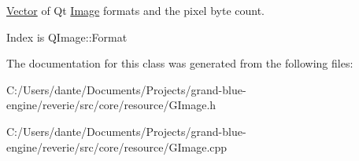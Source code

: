\mbox{\hyperlink{classrev_1_1_vector}{Vector}} of Qt \mbox{\hyperlink{classrev_1_1_image}{Image}} formats and the pixel byte count. 

Index is Q\+Image\+::\+Format 

The documentation for this class was generated from the following files\+:\begin{DoxyCompactItemize}
\item 
C\+:/\+Users/dante/\+Documents/\+Projects/grand-\/blue-\/engine/reverie/src/core/resource/G\+Image.\+h\item 
C\+:/\+Users/dante/\+Documents/\+Projects/grand-\/blue-\/engine/reverie/src/core/resource/G\+Image.\+cpp\end{DoxyCompactItemize}
